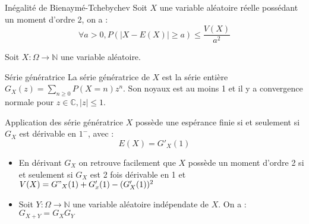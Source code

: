 \documentclass[french, a4paper, 10pt, twocolumn]{article}
\newcommand{\N}{\mathbb{N}}   %
\newcommand{\C}{\mathbb{C}}   %
\begin{document}
\begin{theoreme}{Inégalité de Bienaymé-Tchebychev}
    Soit $X$ une variable aléatoire réelle possédant un moment d'ordre 2, on a :
     \[\forall a>0, P(|X-E(X)|\geqslant a)\leqslant \frac{V(X)}{a^2}\]
\end{theoreme}

Soit \(X : \Omega \rightarrow \N\) une variable aléatoire.

\begin{definition}{Série génératrice}
    La série génératrice de \(X\) est la série entière \(G_X(z)=\sum_{n\geq 0}P(X=n)z^n\).
    Son noyaux est au moins 1 et il y a convergence normale pour \(z \in \C, |z|\leq 1\).
\end{definition}

\begin{theoreme}{Application des série génératrice}
    \(X\) possède une espérance finie si et seulement si \(G_X\) est dérivable en \(1^-\), avec :
        \[E(X)=G'_X(1)\]

    \tcblower
    \begin{itemize}
        \item En dérivant \(G_X\) on retrouve facilement que \(X\) possède un moment d'ordre 2 si et seulement si \(G_X\) est
        2 fois dérivable en 1 et \(V(X)=G"_X(1)+G'_x(1)-(G'_X(1))^2\)
        \item Soit \(Y : \Omega \rightarrow \N\) une variable aléatoire indépendate de \(X\). On a : \(G_{X+Y}=G_X G_Y\)
    \end{itemize}
\end{theoreme}
\end{document}
